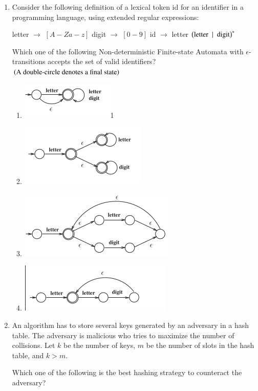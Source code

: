 \documentclass[journal,12pt,onecolumn]{IEEEtran}
\theoremstyle{remark}
\begin{document}
\begin{enumerate}
		\item Consider the following definition of a lexical token id for an identifier in a programming language, using extended regular expressions:
		
		letter $\to$ $[A-Za-z]$
		digit $\to$ $[0-9]$
		id $\to$ letter $\left(\text{letter } \mid \text{ digit}\right)^*$
		
		Which one of the following Non-deterministic Finite-state Automata with $\epsilon$-transitions accepts the set of valid identifiers? $\left(\text{A double-circle denotes a final state}\right)$
		
\hfill{}
		\begin{enumerate}
			\item \includegraphics[width=0.3\linewidth]{figs/screenshot005}1
			\item \includegraphics[width=0.3\linewidth]{figs/screenshot006}
			\item \includegraphics[width=0.3\linewidth]{figs/screenshot007}
			\item \includegraphics[width=0.4\linewidth]{figs/screenshot008}
			\end{enumerate}
		
		\item An algorithm has to store several keys generated by an adversary in a hash table. The adversary is malicious who tries to maximize the number of collisions. Let $k$ be the number of keys, $m$ be the number of slots in the hash table, and $k > m$.
		
		Which one of the following is the best hashing strategy to counteract the adversary?
		

\end{enumerate}
\end{document}
